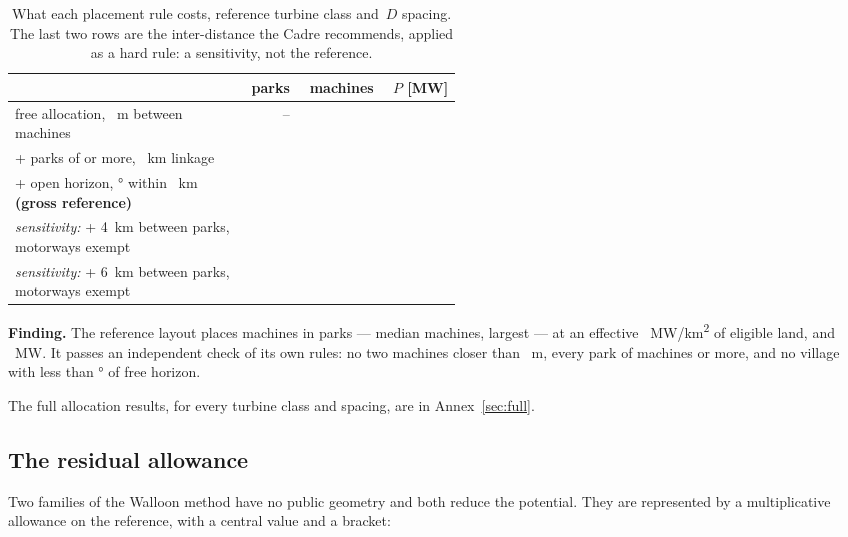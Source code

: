 \documentclass[11pt,a4paper]{article}
\newcommand{\finding}[1]{\par\medskip\noindent\colorbox{wal!10}{%
  \begin{minipage}{\dimexpr\linewidth-2\fboxsep}\textbf{Finding.} #1\end{minipage}}\par\medskip}
\begin{document}
\begin{table}[htbp]\centering\small
\caption{What each placement rule costs, reference turbine class and
\PlaceRotorD{}\,$D$ spacing. The last two rows are the inter-distance the Cadre
recommends, applied as a hard rule: a sensitivity, not the reference.}
\label{tab:rulecost}
\begin{tabular}{p{0.52\linewidth}rrr}
\toprule
 & parks & machines & $P$ [\si{\mega\watt}] \\
\midrule
free allocation, \PlaceSpacing{}~m between machines
  & -- & \FreeTurbines{} & \FreePnom{} \\
+ parks of \PlaceMinTurbines{} or more, \PlaceLink{}~km linkage
  & \NoHorizonParks{} & \NoHorizonTurbines{} & \NoHorizonPnom{} \\
+ open horizon, \PlaceAzimuth{}° within \PlaceHorizonRadius{}~km
  \textbf{(gross reference)}
  & \PlaceParks{} & \PlaceTurbines{} & \PlacePnom{} \\
\midrule
\emph{sensitivity:} + 4~km between parks, motorways exempt
  & \IdFourParks{} & \IdFourTurbines{} & \IdFourMW{} \\
\emph{sensitivity:} + 6~km between parks, motorways exempt
  & \IdSixParks{} & \IdSixTurbines{} & \IdSixMW{} \\
\bottomrule
\end{tabular}
\end{table}

\finding{The reference layout places \PlaceTurbines{} machines in \PlaceParks{}
parks --- median \PlaceMedianPark{} machines, largest \PlaceLargestPark{} ---
at an effective \PlaceDensity{}~MW/\si{\square\kilo\metre} of eligible land, and
\PlacePnom{}~MW. It passes an independent check of its own rules: no two
machines closer than \PlaceCheckSpacing{}~m, every park of
\PlaceMinTurbines{} machines or more, and no village with less than
\PlaceCheckArc{}° of free horizon.}

The full allocation results, for every turbine class and spacing, are in
Annex~\ref{sec:full}.

\subsection{The residual allowance}\label{sec:residual}

Two families of the Walloon method have no public geometry and both reduce the
potential. They are represented by a multiplicative allowance on the reference,
with a central value and a bracket:
\end{document}
